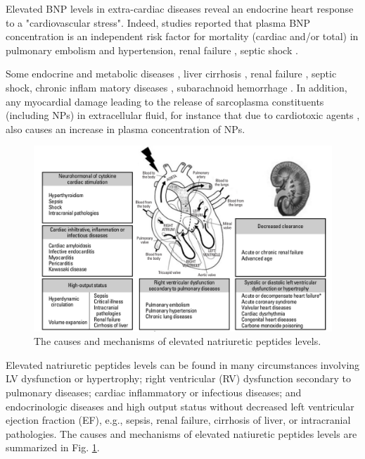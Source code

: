 \documentclass[14pt,a4paper,onecolumn]{extarticle}
\begin{document}
Elevated BNP levels in extra-cardiac diseases reveal an endocrine heart response to a "cardiovascular stress". Indeed,  studies reported that plasma BNP concentration is an independent risk factor for mortality (cardiac and/or total) in pulmonary embolism \citep{121} \citep{123} \citep{bib382} and hypertension, renal failure \citep{bib35} \citep{100} \citep{144}, septic shock \citep{bib385}. %

Some endocrine and metabolic diseases \citep{141}, liver cirrhosis \citep{142} \citep{143} \citep{144}, renal failure \citep{100} \citep{144}, septic shock, chronic inflam matory diseases \citep{bib385} \citep{146} \citep{61} \citep{bib387}, subarachnoid hemorrhage \citep{150} \citep{153}. In addition, any myocardial damage leading to the release of sarcoplasma constituents (including NPs) in extracellular fluid, for instance that due to cardiotoxic agents \citep{bib3152} \citep{bib3151}, also causes an increase in plasma concentration of NPs. %

\begin{figure}      \centering      \includegraphics[scale=0.3]{../../images/NP_causes.png}      \small\caption{The causes and mechanisms of elevated natriuretic peptides levels.}      \label{NP_causes}  \end{figure} %

Elevated natriuretic peptides levels can be found in many circumstances involving LV dysfunction or hypertrophy; right ventricular (RV) dysfunction secondary to pulmonary diseases; cardiac inflammatory or infectious diseases; and endocrinologic diseases and high output status without decreased left ventricular ejection fraction (EF), e.g., sepsis, renal failure, cirrhosis of liver, or intracranial pathologies. The causes and mechanisms of elevated natiuretic peptides levels are summarized in Fig. \ref{NP_causes}. %
\end{document}
